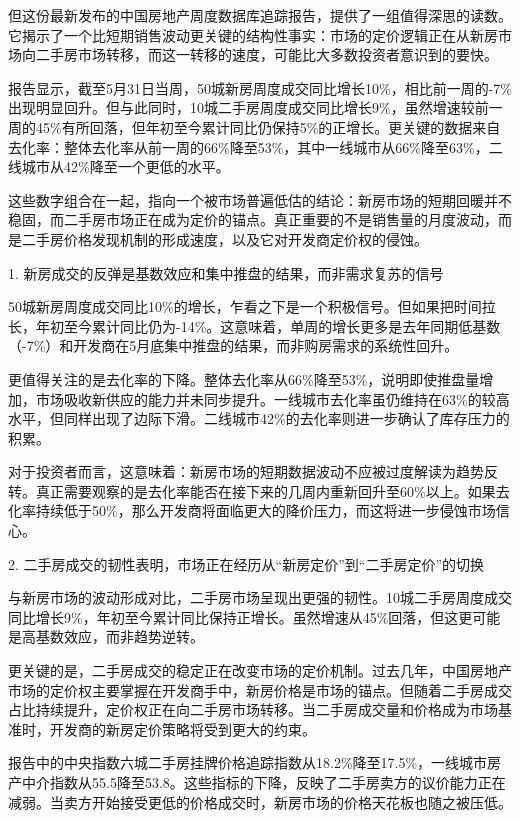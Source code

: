 \documentclass[11pt]{ctexart}
\begin{document}
但这份最新发布的中国房地产周度数据库追踪报告，提供了一组值得深思的读数。它揭示了一个比短期销售波动更关键的结构性事实：市场的定价逻辑正在从新房市场向二手房市场转移，而这一转移的速度，可能比大多数投资者意识到的要快。

报告显示，截至5月31日当周，50城新房周度成交同比增长10\%，相比前一周的-7\%出现明显回升。但与此同时，10城二手房周度成交同比增长9\%，虽然增速较前一周的45\%有所回落，但年初至今累计同比仍保持5\%的正增长。更关键的数据来自去化率：整体去化率从前一周的66\%降至53\%，其中一线城市从66\%降至63\%，二线城市从42\%降至一个更低的水平。

这些数字组合在一起，指向一个被市场普遍低估的结论：新房市场的短期回暖并不稳固，而二手房市场正在成为定价的锚点。真正重要的不是销售量的月度波动，而是二手房价格发现机制的形成速度，以及它对开发商定价权的侵蚀。

1. 新房成交的反弹是基数效应和集中推盘的结果，而非需求复苏的信号

50城新房周度成交同比10\%的增长，乍看之下是一个积极信号。但如果把时间拉长，年初至今累计同比仍为-14\%。这意味着，单周的增长更多是去年同期低基数（-7\%）和开发商在5月底集中推盘的结果，而非购房需求的系统性回升。

更值得关注的是去化率的下降。整体去化率从66\%降至53\%，说明即使推盘量增加，市场吸收新供应的能力并未同步提升。一线城市去化率虽仍维持在63\%的较高水平，但同样出现了边际下滑。二线城市42\%的去化率则进一步确认了库存压力的积累。

对于投资者而言，这意味着：新房市场的短期数据波动不应被过度解读为趋势反转。真正需要观察的是去化率能否在接下来的几周内重新回升至60\%以上。如果去化率持续低于50\%，那么开发商将面临更大的降价压力，而这将进一步侵蚀市场信心。

2. 二手房成交的韧性表明，市场正在经历从“新房定价”到“二手房定价”的切换

与新房市场的波动形成对比，二手房市场呈现出更强的韧性。10城二手房周度成交同比增长9\%，年初至今累计同比保持正增长。虽然增速从45\%回落，但这更可能是高基数效应，而非趋势逆转。

更关键的是，二手房成交的稳定正在改变市场的定价机制。过去几年，中国房地产市场的定价权主要掌握在开发商手中，新房价格是市场的锚点。但随着二手房成交占比持续提升，定价权正在向二手房市场转移。当二手房成交量和价格成为市场基准时，开发商的新房定价策略将受到更大的约束。

报告中的中央指数六城二手房挂牌价格追踪指数从18.2\%降至17.5\%，一线城市房产中介指数从55.5降至53.8。这些指标的下降，反映了二手房卖方的议价能力正在减弱。当卖方开始接受更低的价格成交时，新房市场的价格天花板也随之被压低。
\end{document}
